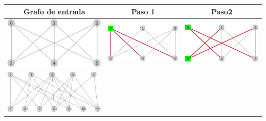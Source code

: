 	\begin{center}
		\begin{tabular}{ |c||c||c| }
			\hline
			Grafo de entrada & Paso 1 & Paso2 \\
			\hline\hline
			\includegraphics[scale = 0.2]{img/ej3/constructiva_golosa/k3,3_st0.png} &
			\includegraphics[scale = 0.2]{img/ej3/constructiva_golosa/k3,3_st1.png} &
			\includegraphics[scale = 0.2]{img/ej3/constructiva_golosa/k3,3_st2.png} \\
			\hline
			\includegraphics[scale = 0.2]{img/ej3/constructiva_golosa/bipartito1_st0.png} &

\end{tabular}
\end{center}
